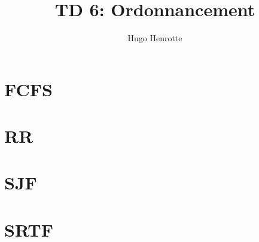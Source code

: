 \documentclass{article}
\author{Hugo Henrotte}
\title{TD 6: Ordonnancement}
\begin{document}
\maketitle

\section{FCFS}



\section{RR}



\section{SJF}



\section{SRTF}


\end{document}
